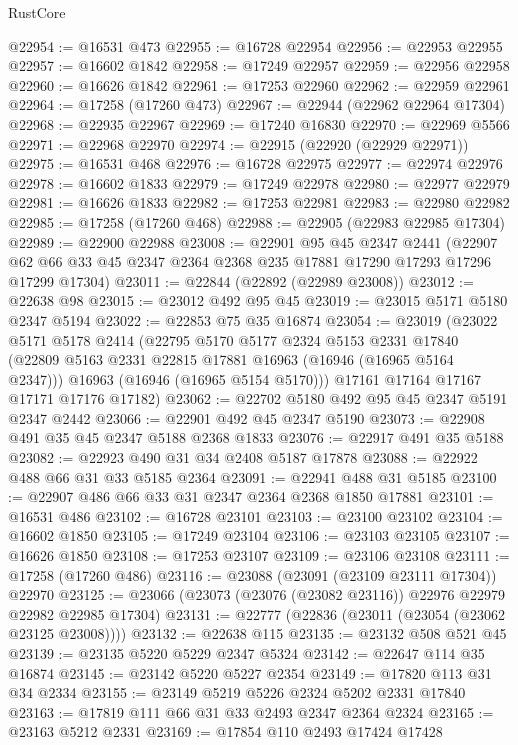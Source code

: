 \begin{lexlean}{RustCore}
\begin{coremodule}
@22954 := @16531 @473
@22955 := @16728 @22954
@22956 := @22953 @22955
@22957 := @16602 @1842
@22958 := @17249 @22957
@22959 := @22956 @22958
@22960 := @16626 @1842
@22961 := @17253 @22960
@22962 := @22959 @22961
@22964 := @17258 (@17260 @473)
@22967 := @22944 (@22962 @22964 @17304)
@22968 := @22935 @22967
@22969 := @17240 @16830
@22970 := @22969 @5566
@22971 := @22968 @22970
@22974 := @22915 (@22920 (@22929 @22971))
@22975 := @16531 @468
@22976 := @16728 @22975
@22977 := @22974 @22976
@22978 := @16602 @1833
@22979 := @17249 @22978
@22980 := @22977 @22979
@22981 := @16626 @1833
@22982 := @17253 @22981
@22983 := @22980 @22982
@22985 := @17258 (@17260 @468)
@22988 := @22905 (@22983 @22985 @17304)
@22989 := @22900 @22988
@23008 := @22901
    @95
    @45
    @2347
    @2441
    (@22907 @62 @66 @33 @45 @2347 @2364 @2368 @235 @17881 @17290 @17293 @17296 @17299 @17304)
@23011 := @22844 (@22892 (@22989 @23008))
@23012 := @22638 @98
@23015 := @23012 @492 @95 @45
@23019 := @23015 @5171 @5180 @2347 @5194
@23022 := @22853 @75 @35 @16874
@23054 := @23019
    (@23022
      @5171
      @5178
      @2414
      (@22795
        @5170
        @5177
        @2324
        @5153
        @2331
        @17840
        (@22809 @5163 @2331 @22815 @17881 @16963 (@16946 (@16965 @5164 @2347)))
        @16963
        (@16946 (@16965 @5154 @5170)))
      @17161
      @17164
      @17167
      @17171
      @17176
      @17182)
@23062 := @22702 @5180 @492 @95 @45 @2347 @5191 @2347 @2442
@23066 := @22901 @492 @45 @2347 @5190
@23073 := @22908 @491 @35 @45 @2347 @5188 @2368 @1833
@23076 := @22917 @491 @35 @5188
@23082 := @22923 @490 @31 @34 @2408 @5187 @17878
@23088 := @22922 @488 @66 @31 @33 @5185 @2364
@23091 := @22941 @488 @31 @5185
@23100 := @22907 @486 @66 @33 @31 @2347 @2364 @2368 @1850 @17881
@23101 := @16531 @486
@23102 := @16728 @23101
@23103 := @23100 @23102
@23104 := @16602 @1850
@23105 := @17249 @23104
@23106 := @23103 @23105
@23107 := @16626 @1850
@23108 := @17253 @23107
@23109 := @23106 @23108
@23111 := @17258 (@17260 @486)
@23116 := @23088 (@23091 (@23109 @23111 @17304)) @22970
@23125 := @23066 (@23073 (@23076 (@23082 @23116)) @22976 @22979 @22982 @22985 @17304)
@23131 := @22777 (@22836 (@23011 (@23054 (@23062 @23125 @23008))))
@23132 := @22638 @115
@23135 := @23132 @508 @521 @45
@23139 := @23135 @5220 @5229 @2347 @5324
@23142 := @22647 @114 @35 @16874
@23145 := @23142 @5220 @5227 @2354
@23149 := @17820 @113 @31 @34 @2334
@23155 := @23149 @5219 @5226 @2324 @5202 @2331 @17840
@23163 := @17819 @111 @66 @31 @33 @2493 @2347 @2364 @2324
@23165 := @23163 @5212 @2331
@23169 := @17854 @110 @2493 @17424 @17428

\end{coremodule}
\end{lexlean}
